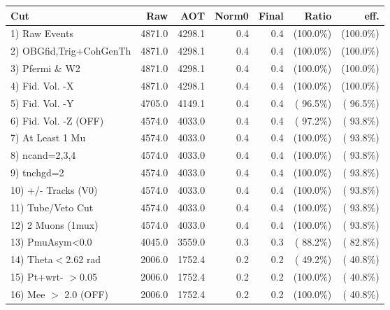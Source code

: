  \begin{table}[h!]\centering
 \begin{tabular}{||l||r|r|r|r|r|r||}
 \hline
 \hline
 Cut & Raw & AOT & Norm0 & Final & Ratio & eff.       \\
 \hline
  1) Raw Events           &       4871.0 &       4298.1 &          0.4 &          0.4 & (100.0\%) & (100.0\%) \\
  2) OBGfid,Trig+CohGenTh &       4871.0 &       4298.1 &          0.4 &          0.4 & (100.0\%) & (100.0\%) \\
  3) Pfermi \& W2         &       4871.0 &       4298.1 &          0.4 &          0.4 & (100.0\%) & (100.0\%) \\
  4) Fid. Vol. -X         &       4871.0 &       4298.1 &          0.4 &          0.4 & (100.0\%) & (100.0\%) \\
  5) Fid. Vol. -Y         &       4705.0 &       4149.1 &          0.4 &          0.4 & ( 96.5\%) & ( 96.5\%) \\
  6) Fid. Vol. -Z (OFF)   &       4574.0 &       4033.0 &          0.4 &          0.4 & ( 97.2\%) & ( 93.8\%) \\
  7) At Least 1 Mu        &       4574.0 &       4033.0 &          0.4 &          0.4 & (100.0\%) & ( 93.8\%) \\
  8) ncand=2,3,4          &       4574.0 &       4033.0 &          0.4 &          0.4 & (100.0\%) & ( 93.8\%) \\
  9) tnchgd=2             &       4574.0 &       4033.0 &          0.4 &          0.4 & (100.0\%) & ( 93.8\%) \\
 10) +/- Tracks (V0)      &       4574.0 &       4033.0 &          0.4 &          0.4 & (100.0\%) & ( 93.8\%) \\
 11) Tube/Veto Cut        &       4574.0 &       4033.0 &          0.4 &          0.4 & (100.0\%) & ( 93.8\%) \\
 12) 2 Muons (1mux)       &       4574.0 &       4033.0 &          0.4 &          0.4 & (100.0\%) & ( 93.8\%) \\
 13) PmuAsym<0.0          &       4045.0 &       3559.0 &          0.3 &          0.3 & ( 88.2\%) & ( 82.8\%) \\
 14) Theta$<$2.62 rad     &       2006.0 &       1752.4 &          0.2 &          0.2 & ( 49.2\%) & ( 40.8\%) \\
 15) Pt+wrt- $>$0.05      &       2006.0 &       1752.4 &          0.2 &          0.2 & (100.0\%) & ( 40.8\%) \\
 16) Mee $>$ 2.0  (OFF)   &       2006.0 &       1752.4 &          0.2 &          0.2 & (100.0\%) & ( 40.8\%) \\

\end{tabular}
\end{table}
